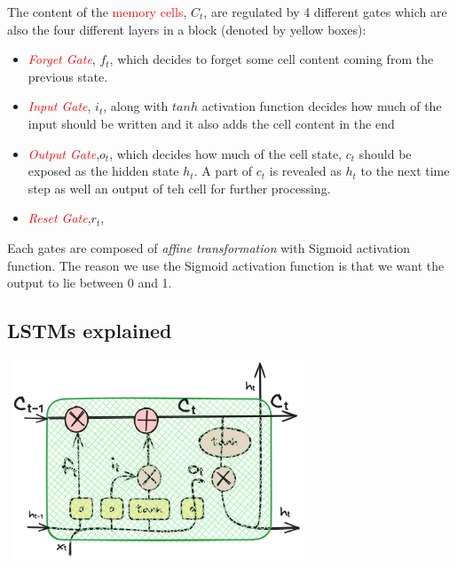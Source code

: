 \documentclass{article}
\begin{document}
The content of the \textcolor{red}{memory cells}, $C_t$, are regulated by 4 different gates which are also the four  different layers in a block (denoted by yellow boxes):
\begin{itemize}
    \item \textcolor{red}{\textit{Forget Gate}}, $f_t$, which decides to forget some cell content coming from the previous state. 
    \item \textcolor{red}{\textit{Input Gate}}, $i_t$, along with $tanh$ activation function decides how much of the input should be written and it also adds the cell content in the end
    \item \textcolor{red}{\textit{Output Gate}},$o_t$,  which decides how much of the cell state, $c_t$ should be exposed as the hidden state $h_t$. A part of $c_t$ is revealed as $h_t$ to the next time step as well an output of teh cell for further processing. 
    \item \textcolor{red}{\textit{Reset Gate}},$r_t$,
\end{itemize}
Each gates are composed of \textit{affine transformation} with Sigmoid activation function. The reason we use the Sigmoid activation function is that we want the output to lie between 0 and 1. 
\subsection{LSTMs explained}
\begin{center}
  \includegraphics[width=9cm, height=6cm]{LSTM/images/CellState.png}  
\end{center}
\end{document}
